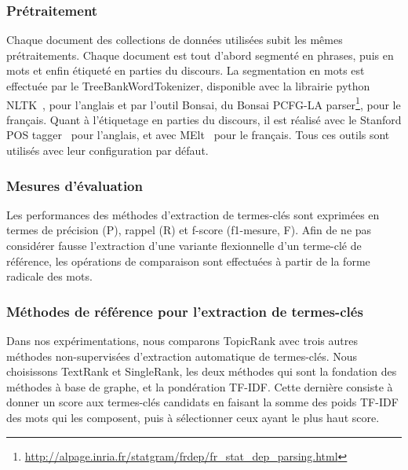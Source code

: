     \subsubsection{Prétraitement}
    \label{subsubsec:pretraitement}
      Chaque document des collections de données utilisées subit les mêmes
      prétraitements. Chaque document est tout d'abord segmenté en phrases, puis
      en mots et enfin étiqueté en parties du discours. La segmentation en mots
      est effectuée par le TreeBankWordTokenizer, disponible avec la librairie
      python NLTK~\cite[\textit{Natural Language ToolKit}]{bird2009nltk}, pour
      l'anglais et par l'outil Bonsai, du Bonsai PCFG-LA
      parser\footnote{\url{http://alpage.inria.fr/statgram/frdep/fr_stat_dep_parsing.html}},
      pour le français. Quant à l'étiquetage en parties du discours, il est
      réalisé avec le Stanford POS tagger~\cite{toutanova2003stanfordpostagger}
      pour l'anglais, et avec MElt~\cite{denis2009melt} pour le français. Tous
      ces outils sont utilisés avec leur configuration par défaut.

    \subsubsection{Mesures d'évaluation}
    \label{subsubsec:mesures_d_evaluation}
      Les performances des méthodes d'extraction de termes-clés sont exprimées
      en termes de précision (P), rappel (R) et f-score (f1-mesure, F). Afin de
      ne pas considérer fausse l'extraction d'une variante flexionnelle d'un
      terme-clé de référence, les opérations de comparaison sont effectuées à
      partir de la forme radicale des mots.

    \subsubsection{Méthodes de référence pour l'extraction de termes-clés}
    \label{subsubsec:systemes_de_reference_pour_l_extraction_de_termes_cles}
      Dans nos expérimentations, nous comparons TopicRank avec trois autres
      méthodes non-supervisées d'extraction automatique de termes-clés. Nous
      choisissons TextRank et SingleRank, les deux méthodes qui sont la
      fondation des méthodes à base de graphe, et la pondération TF-IDF. Cette
      dernière consiste à donner un score aux termes-clés candidats en faisant
      la somme des poids TF-IDF des mots qui les composent, puis à sélectionner
      ceux ayant le plus haut score.

